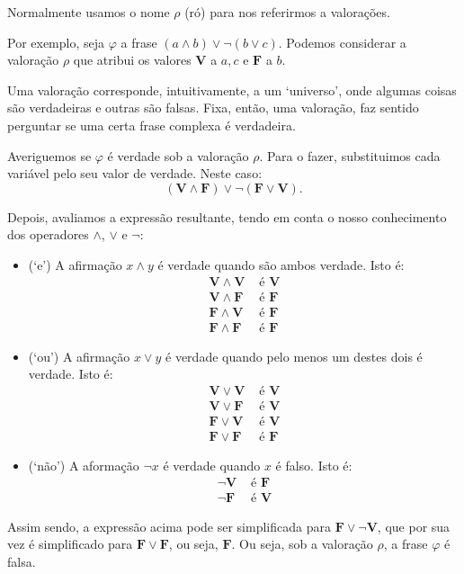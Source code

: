 \documentclass{article}
\theoremstyle{definition}
\theoremstyle{remark}
\newcommand{\V}{\mathbf{V}}
\newcommand{\F}{\mathbf{F}}
\begin{document}
	Normalmente usamos o nome $\rho$ (ró) para nos referirmos a valorações.
	
	Por exemplo, seja $\varphi$ a frase $(a \land b) \lor \neg (b \lor c)$. Podemos considerar a valoração $\rho$ que atribui os valores $\V$ a $a, c$ e $\F$ a $b$.
	
	Uma valoração corresponde, intuitivamente, a um `universo', onde algumas coisas são verdadeiras e outras são falsas. Fixa, então, uma valoração, faz sentido perguntar se uma certa frase complexa é verdadeira.
	
	Averiguemos se $\varphi$ é verdade sob a valoração $\rho$. Para o fazer, substituimos cada variável pelo seu valor de verdade. Neste caso:
	\[(\V \land \F) \lor \neg (\F \lor \V).\]
	
	Depois, avaliamos a expressão resultante, tendo em conta o nosso conhecimento dos operadores $\land$, $\lor$ e $\neg$:
	
	\begin{itemize}
	\item (`e') A afirmação $x \land y$ é verdade quando são ambos verdade. Isto é:
	\begin{align*}
	\V \land \V &\text{ é } \V\\
	\V \land \F &\text{ é } \F\\
	\F \land \V &\text{ é } \F\\
	\F \land \F &\text{ é } \F
	\end{align*}
	
	\item (`ou') A afirmação $x \lor y$ é verdade quando pelo menos um destes dois é verdade. Isto é:
	\begin{align*}
	\V \lor \V &\text{ é } \V\\
	\V \lor \F &\text{ é } \V\\
	\F \lor \V &\text{ é } \V\\
	\F \lor \F &\text{ é } \F
	\end{align*}
	
	\item (`não') A aformação $\neg x$ é verdade quando $x$ é falso. Isto é:
	\begin{align*}
	\neg \V &\text{ é } \F\\
	\neg \F &\text{ é } \V
	\end{align*}
	\end{itemize}
	
	Assim sendo, a expressão acima pode ser simplificada para $\F \lor \neg \V$, que por sua vez é simplificado para $\F \lor \F$, ou seja, $\F$. Ou seja, sob a valoração $\rho$, a frase $\varphi$ é falsa.
	
\end{document}
